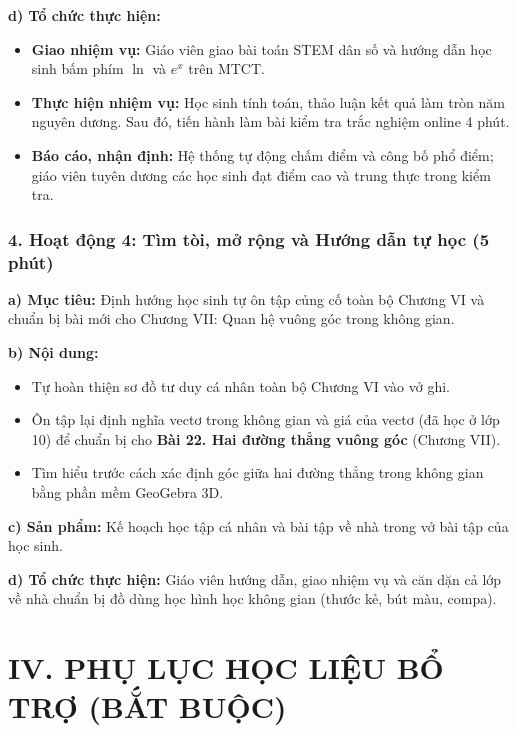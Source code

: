 \documentclass[12pt, a4paper]{article}
\begin{document}
\noindent \textbf{d) Tổ chức thực hiện:}
\begin{itemize}[leftmargin=0.6cm]
    \item \textbf{Giao nhiệm vụ:} Giáo viên giao bài toán STEM dân số và hướng dẫn học sinh bấm phím $\ln$ và $e^x$ trên MTCT.
    \item \textbf{Thực hiện nhiệm vụ:} Học sinh tính toán, thảo luận kết quả làm tròn năm nguyên dương. Sau đó, tiến hành làm bài kiểm tra trắc nghiệm online 4 phút.
    \item \textbf{Báo cáo, nhận định:} Hệ thống tự động chấm điểm và công bố phổ điểm; giáo viên tuyên dương các học sinh đạt điểm cao và trung thực trong kiểm tra.
\end{itemize}

\subsubsection*{4. Hoạt động 4: Tìm tòi, mở rộng và Hướng dẫn tự học (5 phút)}

\noindent \textbf{a) Mục tiêu:}
Định hướng học sinh tự ôn tập củng cố toàn bộ Chương VI và chuẩn bị bài mới cho Chương VII: Quan hệ vuông góc trong không gian.

\noindent \textbf{b) Nội dung:}
\begin{itemize}[leftmargin=0.6cm]
    \item Tự hoàn thiện sơ đồ tư duy cá nhân toàn bộ Chương VI vào vở ghi.
    \item Ôn tập lại định nghĩa vectơ trong không gian và giá của vectơ (đã học ở lớp 10) để chuẩn bị cho \textbf{Bài 22. Hai đường thẳng vuông góc} (Chương VII).
    \item Tìm hiểu trước cách xác định góc giữa hai đường thẳng trong không gian bằng phần mềm GeoGebra 3D.
\end{itemize}

\noindent \textbf{c) Sản phẩm:}
Kế hoạch học tập cá nhân và bài tập về nhà trong vở bài tập của học sinh.

\noindent \textbf{d) Tổ chức thực hiện:}
Giáo viên hướng dẫn, giao nhiệm vụ và căn dặn cả lớp về nhà chuẩn bị đồ dùng học hình học không gian (thước kẻ, bút màu, compa).

\vspace{10pt}

\section*{IV. PHỤ LỤC HỌC LIỆU BỔ TRỢ (BẮT BUỘC)}
\end{document}
